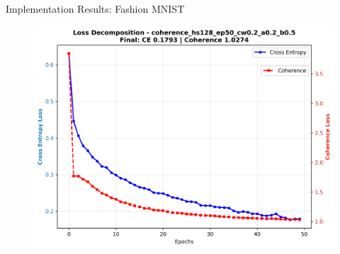 \documentclass[9pt,dvipsnames]{beamer}
\begin{document}
\begin{frame}{Implementation Results: Fashion MNIST}
\begin{figure}[H]
\begin{minipage}[b]{0.48\textwidth}
            \includegraphics[width=\textwidth,height=0.48\textheight,keepaspectratio]{../plots/mlp/fashion_mnist/hs128_ep50/coherence_hs128_ep50_cw0.2_a0.2_b0.5_loss_decomposition.png}
        \end{minipage}
    \end{figure}

\end{frame}
\end{document}
